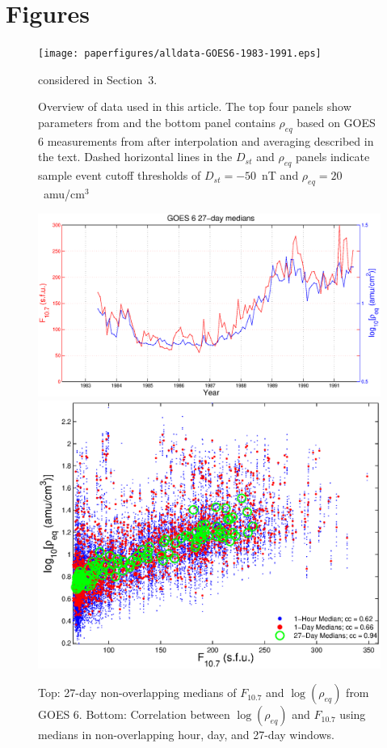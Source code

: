 \documentclass[10pt,twocolumn]{article}
\begin{document}
\clearpage
\section{Figures}

\begin{figure}[htp!]
\centering
\texttt{[image: paperfigures/alldata-GOES6-1983-1991.eps]}
\caption{Overview of data used in this article. The top four panels show parameters from \cite{Kondrashov2014ReconstructionOfGaps} and the bottom panel contains $\rho_{eq}$ based on GOES 6 measurements from \cite{Denton} after interpolation and averaging described in the text. Dashed horizontal lines in the $D_{st}$ and $\rho_{eq}$ panels indicate sample event cutoff thresholds of $D_{st} = -50$~nT and $\rho_{eq} = 20$~amu/cm$^3$} considered in Section~3.
\label{AllData}
\end{figure}

\begin{figure}[htp!]
\centering
\includegraphics[scale=0.40]{paperfigures/F107MD27d-GOES6.eps}
\includegraphics[scale=0.40]{paperfigures/ccplot-GOES6.eps}
\caption{Top: 27-day non-overlapping medians of $F_{10.7}$ and $\log(\rho_{eq})$ from GOES 6. Bottom: Correlation between $\log(\rho_{eq})$ and $F_{10.7}$ using medians in non-overlapping hour, day, and 27-day windows.}
\label{ccplot}
\end{figure}
\clearpage
\end{document}
